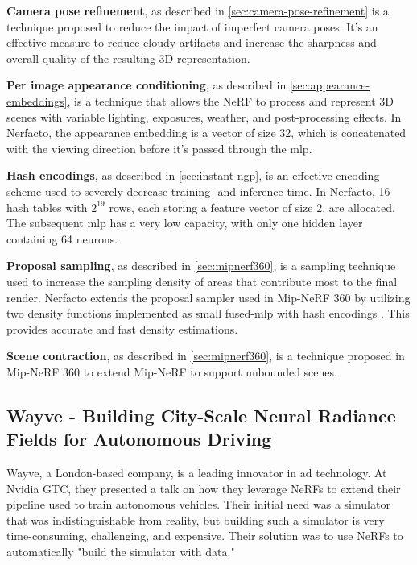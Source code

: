 

\textbf{Camera pose refinement}, as described in \autoref{sec:camera-pose-refinement} is a technique proposed to reduce the impact of imperfect camera poses. It's an effective measure to reduce cloudy artifacts and increase the sharpness and overall quality of the resulting 3D representation.

\textbf{Per image appearance conditioning}, as described in \autoref{sec:appearance-embeddings}, is a technique that allows the NeRF to process and represent 3D scenes with variable lighting, exposures, weather, and post-processing effects. In Nerfacto, the appearance embedding is a vector of size 32, which is concatenated with the viewing direction before it's passed through the \acrshort{mlp}.

\textbf{Hash encodings}, as described in \autoref{sec:instant-ngp}, is an effective encoding scheme used to severely decrease training- and inference time. In Nerfacto, 16 hash tables with $2^{19}$ rows, each storing a feature vector of size 2, are allocated. The subsequent \acrshort{mlp} has a very low capacity, with only one hidden layer containing 64 neurons.

\textbf{Proposal sampling}, as described in \autoref{sec:mipnerf360}, is a sampling technique used to increase the sampling density of areas that contribute most to the final render. Nerfacto extends the proposal sampler used in Mip-NeRF 360 \cite{barron_mip-nerf_2022} by utilizing two density functions implemented as small fused-\acrshort{mlp} with hash encodings \cite{muller_instant_2022}. This provides accurate and fast density estimations.

\textbf{Scene contraction}, as described in \autoref{sec:mipnerf360}, is a technique proposed in Mip-NeRF 360 \cite{barron_mip-nerf_2022} to extend Mip-NeRF to support unbounded scenes.




\subsection[Wayve - NeRFs for Autonomous Driving]{Wayve - Building City-Scale Neural Radiance Fields for Autonomous Driving} \label{sec:wayve}
Wayve, a London-based company, is a leading innovator in \acrshort{ad} technology. At Nvidia GTC, they presented a talk on how they leverage NeRFs to extend their pipeline used to train autonomous vehicles. Their initial need was a simulator that was indistinguishable from reality, but building such a simulator is very time-consuming, challenging, and expensive. Their solution was to use NeRFs to automatically "build the simulator with data."

